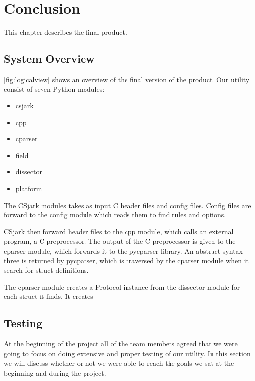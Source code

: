 \chapter{Conclusion}
\label{cha:conclusion}
This chapter describes the final product.


\section{System Overview}
\autoref{fig:logicalview} shows an overview of the final version of the
product. Our utility consist of seven Python modules:
\begin{itemize}
	\item csjark
	\item cpp
	\item cparser
	\item field
	\item dissector
	\item platform
\end{itemize}
The CSjark modules takes as input C header files and config files. Config
files are forward to the config module which reads them to find rules and
options.

CSjark then forward header files to the cpp module, which calls an external
program, a C preprocessor. The output of the C preprocessor is given to the
cparser module, which forwards it to the pycparser library. An abstract
syntax three is returned by pycparser, which is traversed by the cparser
module when it search for struct definitions.

The cparser module creates a Protocol instance from the dissector module for
each struct it finds. It creates 



\section{Testing}
At the beginning of the project all of the team members agreed that we were going to focus on doing extensive and proper testing of our utility. In this section we will discuss whether or not we were able to reach the goals we sat at the beginning and during the project.


